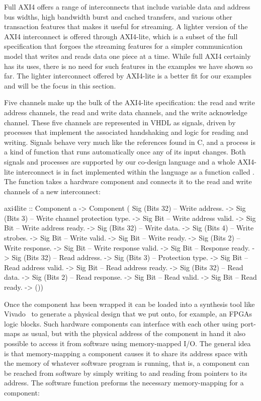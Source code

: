 \documentclass[../paper.tex]{subfiles}
\begin{document}
Full AXI4 offers a range of interconnects that include variable data and address bus widths, high bandwidth burst and cached transfers, and various other transaction features that makes it useful for streaming. A lighter version of the AXI4 interconnect is offered through AXI4-lite, which is a subset of the full specification that forgoes the streaming features for a simpler communication model that writes and reads data one piece at a time. While full AXI4 certainly has its uses, there is no need for such features in the examples we have shown so far. The lighter interconnect offered by AXI4-lite is a better fit for our examples and will be the focus in this section.

Five channels make up the bulk of the AXI4-lite specification: the read and write address channels, the read and write data channels, and the write acknowledge channel. These five channels are represented in VHDL as signals, driven by processes that implement the associated handshaking and logic for reading and writing. Signals behave very much like the references found in C, and a process is a kind of function that runs automatically once any of its input changes. Both signals and processes are supported by our co-design language and a whole AXI4-lite interconnect is in fact implemented within the language as a function called . The function takes a hardware component and connects it to the read and write channels of a new interconnect:

\begin{code}
axi4lite ::
     Component a
  -> Component (
          Sig (Bits 32) -- Write address.
       -> Sig (Bits 3)  -- Write channel protection type.
       -> Sig Bit       -- Write address valid.
       -> Sig Bit       -- Write address ready.
       -> Sig (Bits 32) -- Write data.
       -> Sig (Bits 4)  -- Write strobes.
       -> Sig Bit       -- Write valid.
       -> Sig Bit       -- Write ready.
       -> Sig (Bits 2)  -- Write response.
       -> Sig Bit       -- Write response valid.
       -> Sig Bit       -- Response ready.
       -> Sig (Bits 32) -- Read address.
       -> Sig (Bits 3)  -- Protection type.
       -> Sig Bit       -- Read address valid.
       -> Sig Bit       -- Read address ready.
       -> Sig (Bits 32) -- Read data.
       -> Sig (Bits 2)  -- Read response.
       -> Sig Bit       -- Read valid.
       -> Sig Bit       -- Read ready.    
       -> ())
\end{code}

Once the component has been wrapped it can be loaded into a synthesis tool like Vivado~\cite{feist2012} to generate a physical design that we put onto, for example, an FPGAs logic blocks. Such hardware components can interface with each other using port-maps as usual, but with the physical address of the component in hand it also possible to access it from software using memory-mapped I/O. The general idea is that memory-mapping a component causes it to share its address space with the memory of whatever software program is running, that is, a component can be reached from software by simply writing to and reading from pointers to its address. The software function  preforms the necessary memory-mapping for a component:
\end{document}
